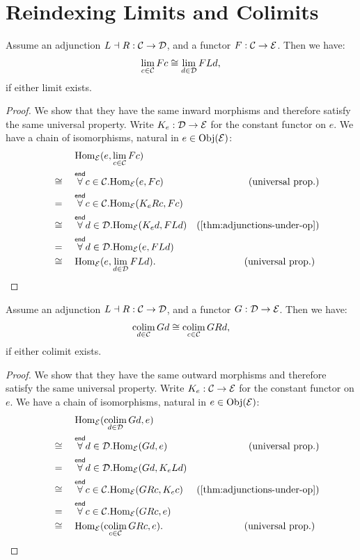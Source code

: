 \documentclass[a4paper]{memoir}
\begin{document}
\section{Reindexing Limits and Colimits}
\begin{proposition} \label{thm:reindex-lim}
	Assume an adjunction $L \dashv R : {\mathcal{C}} \to {\mathcal{D}}$, and a functor $F : {\mathcal{C}} \to {\mathcal{E}}$. Then we have:
	\[
		\lim_{c \in {\mathcal{C}}} Fc \cong \lim_{d \in {\mathcal{D}}} FLd,
	\]
	if either limit exists.
\end{proposition}
\begin{proof}
	We show that they have the same inward morphisms and therefore satisfy the same universal property.
	Write $K_e : {\mathcal{D}} \to {\mathcal{E}}$ for the constant functor on $e$.
	We have a chain of isomorphisms, natural in $e \in \mathrm{Obj}({\mathcal{E}})$:
	\begin{align*}
		&{} \mathrel{\phantom{\quad\cong\quad}}
		\Hom_\catE(e, \lim_{c \in \catC} Fc)
		\\ &{} \quad\cong\quad
		\forallend c \in \catC . \Hom_\catE(e, Fc)
		& \text{(universal prop.)}
		\\ &{} \quad=\quad
		\forallend c \in \catC . \Hom_\catE(K_e Rc, Fc)
		\\ &{} \quad\cong\quad
		\forallend d \in \catD . \Hom_\catE(K_e d, FLd)
		& \text{(\cref{thm:adjunctions-under-op})}
		\\ &{} \quad=\quad
		\forallend d \in \catD . \Hom_\catE(e, FLd)
		\\ &{} \quad\cong\quad
		\Hom_\catE(e, \lim_{d \in \catD} FLd). &\text{(universal prop.) } \qedhere
	\end{align*}
\end{proof}
\begin{proposition} \label{thm:reindex-lim}\label{thm:reindex-colim}
	Assume an adjunction $L \dashv R : {\mathcal{C}} \to {\mathcal{D}}$, and a functor $G : {\mathcal{D}} \to {\mathcal{E}}$. Then we have:
	\[
		\operatorname*{colim}_{d \in {\mathcal{C}}} Gd \cong \operatorname*{colim}_{c \in {\mathcal{C}}} GRd,
	\]
	if either colimit exists.
\end{proposition}
\begin{proof}
	We show that they have the same outward morphisms and therefore satisfy the same universal property.
	Write $K_e : {\mathcal{C}} \to {\mathcal{E}}$ for the constant functor on $e$.
	We have a chain of isomorphisms, natural in $e \in \mathrm{Obj}({\mathcal{E}})$:
	\begin{align*}
		&{} \mathrel{\phantom{\quad\cong\quad}}
		\Hom_\catE(\colim_{d \in \catD} Gd, e)
		\\ &{} \quad\cong\quad
		\forallend d \in \catD . \Hom_\catE(Gd, e)
		& \text{(universal prop.)}
		\\ &{} \quad=\quad
		\forallend d \in \catD . \Hom_\catE(Gd, K_e Ld)
		\\ &{} \quad\cong\quad
		\forallend c \in \catC . \Hom_\catE(GRc, K_e c)
		& \text{(\cref{thm:adjunctions-under-op})}
		\\ &{} \quad=\quad
		\forallend c \in \catC . \Hom_\catE(GRc, e)
		\\ &{} \quad\cong\quad
		\Hom_\catE(\colim_{c \in \catC} GRc, e). &\text{(universal prop.) } \qedhere
	\end{align*}
\end{proof}
\end{document}
